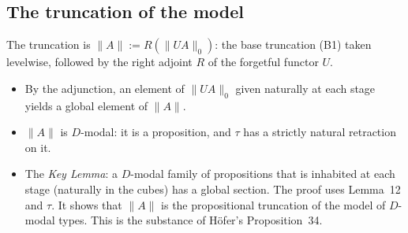 \documentclass[11pt]{amsart}
\theoremstyle{definition}
\theoremstyle{remark}
\begin{document}
\subsection{The truncation of the model}
The truncation is $\|A\| := R(\|UA\|_0)$: the base truncation (B1) taken
levelwise, followed by the right adjoint $R$ of the forgetful functor $U$.
\begin{itemize}
\item By the adjunction, an element of $\|UA\|_0$ given naturally at each
stage yields a global element of $\|A\|$.
\item $\|A\|$ is $D$-modal: it is a proposition, and $\tau$ has a strictly
natural retraction on it.
\item The \emph{Key Lemma}: a $D$-modal family of propositions that is
inhabited at each stage (naturally in the cubes) has a global section.
The proof uses Lemma~12 and $\tau$. It shows that $\|A\|$ is the
propositional truncation of the model of $D$-modal types. This is the
substance of H\"ofer's Proposition~34.
\end{itemize}
\end{document}
